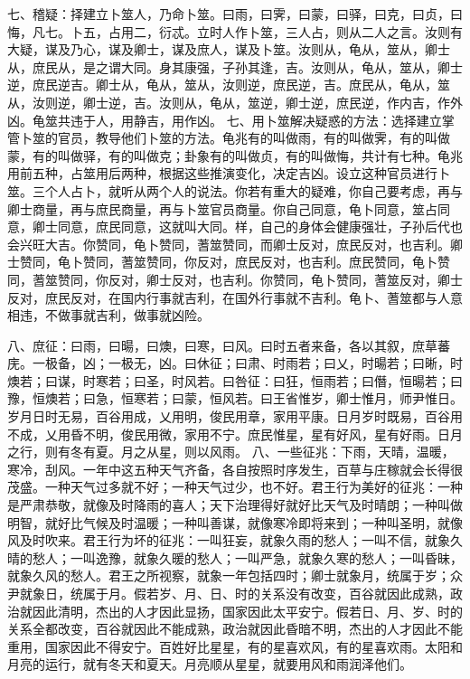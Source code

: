 \documentclass[a4paper,12pt,UTF8,twoside]{ctexbook}
\begin{document}
七、稽疑：择建立卜筮人，乃命卜筮。曰雨，曰霁，曰蒙，曰驿，曰克，曰贞，曰悔，凡七。卜五，占用二，衍忒。立时人作卜筮，三人占，则从二人之言。汝则有大疑，谋及乃心，谋及卿士，谋及庶人，谋及卜筮。汝则从，龟从，筮从，卿士从，庶民从，是之谓大同。身其康强，子孙其逢，吉。汝则从，龟从，筮从，卿士逆，庶民逆吉。卿士从，龟从，筮从，汝则逆，庶民逆，吉。庶民从，龟从，筮从，汝则逆，卿士逆，吉。汝则从，龟从，筮逆，卿士逆，庶民逆，作内吉，作外凶。龟筮共违于人，用静吉，用作凶。
七、用卜筮解决疑惑的方法：选择建立掌管卜筮的官员，教导他们卜筮的方法。龟兆有的叫做雨，有的叫做霁，有的叫做蒙，有的叫做驿，有的叫做克；卦象有的叫做贞，有的叫做悔，共计有七种。龟兆用前五种，占筮用后两种，根据这些推演变化，决定吉凶。设立这种官员进行卜筮。三个人占卜，就听从两个人的说法。你若有重大的疑难，你自己要考虑，再与卿士商量，再与庶民商量，再与卜筮官员商量。你自己同意，龟卜同意，筮占同意，卿士同意，庶民同意，这就叫大同。样，自己的身体会健康强壮，子孙后代也会兴旺大吉。你赞同，龟卜赞同，蓍筮赞同，而卿士反对，庶民反对，也吉利。卿士赞同，龟卜赞同，蓍筮赞同，你反对，庶民反对，也吉利。庶民赞同，龟卜赞同，蓍筮赞同，你反对，卿士反对，也吉利。你赞同，龟卜赞同，蓍筮反对，卿士反对，庶民反对，在国内行事就吉利，在国外行事就不吉利。龟卜、蓍筮都与人意相违，不做事就吉利，做事就凶险。

八、庶征：曰雨，曰暘，曰燠，曰寒，曰风。曰时五者来备，各以其叙，庶草蕃庑。一极备，凶；一极无，凶。曰休征；曰肃、时雨若；曰乂，时暘若；曰晰，时燠若；曰谋，时寒若；曰圣，时风若。曰咎征：曰狂，恒雨若；曰僭，恒暘若；曰豫，恒燠若；曰急，恒寒若；曰蒙，恒风若。曰王省惟岁，卿士惟月，师尹惟日。岁月日时无易，百谷用成，乂用明，俊民用章，家用平康。日月岁时既易，百谷用不成，乂用昏不明，俊民用微，家用不宁。庶民惟星，星有好风，星有好雨。日月之行，则有冬有夏。月之从星，则以风雨。
八、一些征兆：下雨，天晴，温暖，寒冷，刮风。一年中这五种天气齐备，各自按照时序发生，百草与庄稼就会长得很茂盛。一种天气过多就不好；一种天气过少，也不好。君王行为美好的征兆：一种是严肃恭敬，就像及时降雨的喜人；天下治理得好就好比天气及时晴朗；一种叫做明智，就好比气候及时温暖；一种叫善谋，就像寒冷即将来到；一种叫圣明，就像风及时吹来。君王行为坏的征兆：一叫狂妄，就象久雨的愁人；一叫不信，就象久晴的愁人；一叫逸豫，就象久暖的愁人；一叫严急，就象久寒的愁人；一叫昏昧，就象久风的愁人。君王之所视察，就象一年包括四时；卿士就象月，统属于岁；众尹就象日，统属于月。假若岁、月、日、时的关系没有改变，百谷就因此成熟，政治就因此清明，杰出的人才因此显扬，国家因此太平安宁。假若日、月、岁、时的关系全都改变，百谷就因此不能成熟，政治就因此昏暗不明，杰出的人才因此不能重用，国家因此不得安宁。百姓好比星星，有的星喜欢风，有的星喜欢雨。太阳和月亮的运行，就有冬天和夏天。月亮顺从星星，就要用风和雨润泽他们。
\end{document}
